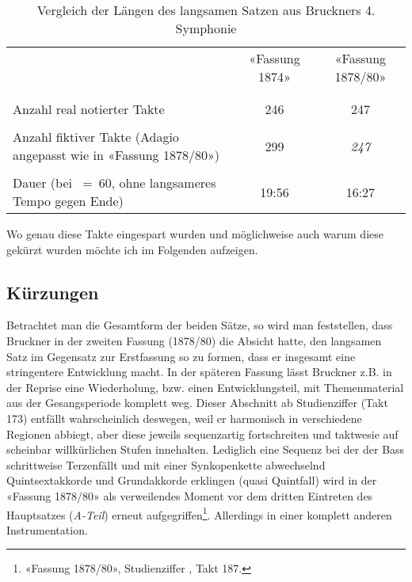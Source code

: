 \begin{table}[htbp]
	\caption{Vergleich der Längen des langsamen Satzen aus Bruckners 4. Symphonie}
	\label{tab:duration}
	\centering
	\begin{tabular}{p{5.5cm}|cc}
		& «Fassung 1874» & «Fassung 1878/80» \\
		&& \\[-0.5em]
		\hline
		&& \\[-0.5em]
		Anzahl real notierter Takte & 246 & 247 \\
		&& \\[-0.5em]
		Anzahl fiktiver Takte \small{(Adagio angepasst wie in «Fassung 1878/80»)} & 299 & \emph{247} \\
		&& \\[-0.5em]
		Dauer \small{(bei \quarternote~=~60, ohne langsameres Tempo gegen Ende)} & 19:56 & 16:27 \\
	\end{tabular}
\end{table}

Wo genau diese Takte eingespart wurden und möglichweise auch warum diese gekürzt wurden möchte ich im Folgenden aufzeigen.


\subsection{Kürzungen}

Betrachtet man die Gesamtform der beiden Sätze, so wird man feststellen, dass Bruckner in der zweiten Fassung (1878/80) die Absicht hatte, den langsamen Satz im Gegensatz zur Erstfassung so zu formen, dass er insgesamt eine stringentere Entwicklung macht.
In der späteren Fassung lässt Bruckner z.B. in der Reprise eine Wiederholung, bzw. einen Entwicklungsteil, mit Themenmaterial aus der Gesangsperiode komplett weg.
Dieser Abschnitt ab Studienziffer  (Takt 173) entfällt wahrscheinlich deswegen, weil er harmonisch in verschiedene Regionen abbiegt, aber diese jeweils sequenzartig fortschreiten und taktwesie auf scheinbar willkürlichen Stufen innehalten.
Lediglich eine Sequenz bei der der Bass schrittweise Terzenfällt und mit einer Synkopenkette abwechselnd Quintsextakkorde und Grundakkorde erklingen (quasi Quintfall) wird in der «Fassung 1878/80» als verweilendes Moment vor dem dritten Eintreten des Hauptsatzes (\emph{A-Teil}) erneut aufgegriffen\footnote{«Fassung 1878/80», Studienziffer , Takt 187.}.
Allerdings in einer komplett anderen Instrumentation.

